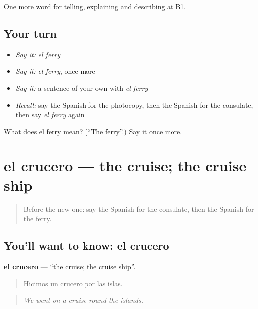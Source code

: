 \begin{grammarlens}[title={What you've built}]
One more word for telling, explaining and describing at B1.
\end{grammarlens}

\subsection*{Your turn}
\begin{itemize}
\raggedright
  \item \emph{Say it:} \emph{el ferry}
  \item \emph{Say it:} \emph{el ferry}, once more
  \item \emph{Say it:} a sentence of your own with \emph{el ferry}
  \item \emph{Recall:} say the Spanish for the photocopy, then the Spanish for the consulate, then say \emph{el ferry} again
\end{itemize}

\begin{tcolorbox}[breakable,colback=teal!4,colframe=teal!35!black,title={Before you move on}]
What does el ferry mean? (\textquotedblleft{}The ferry\textquotedblright{}.) Say it once more.
\end{tcolorbox}
\section[el crucero]{el crucero — the cruise; the cruise ship}

\label{lesson:ES-C658-crucero}



\begin{quote}
Before the new one: say the Spanish for the consulate, then the Spanish for the ferry.
\end{quote}

\subsection*{You'll want to know: el crucero}
\textbf{el crucero} — \textquotedblleft{}the cruise; the cruise ship\textquotedblright{}.

\begin{quote}
Hicimos un crucero por las islas.
\end{quote}

\begin{quote}
\emph{We went on a cruise round the islands.}
\end{quote}

